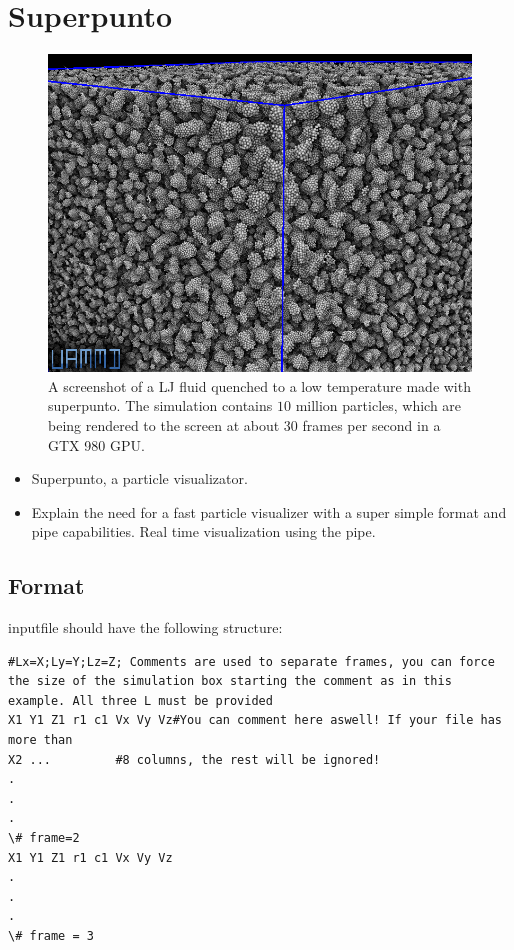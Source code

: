 \documentclass[ twoside,openright,titlepage,numbers=noenddot,%
headinclude,footinclude,cleardoublepage=empty,abstract=on,
BCOR=5mm,paper=a4,fontsize=11pt, dvipsnames
]{scrreprt}
\def\ucpp{uammd_cpp_lexer.py:UAMMDCppLexer -x}
\newcommand{\gpu}{\gls{GPU}\xspace}
\begin{document}
\chapter{Superpunto}
\begin{figure}[H]
  \label{fig:spunto}
  \centering
  \includegraphics[width=\textwidth]{gfx/shotlogo}
  \caption{A screenshot of a \gls{LJ} fluid quenched to a low temperature made with superpunto. The simulation contains $10$ million particles, which are being rendered to the screen at about 30 frames per second in a GTX 980 \gpu.}
\end{figure}

\begin{itemize}
\item Superpunto, a particle visualizator.
\item Explain the need for a fast particle visualizer with a super simple format and pipe capabilities. Real time visualization using the pipe.
  
\end{itemize}

\section{Format}
inputfile should have the following structure:
\begin{verbatim}
#Lx=X;Ly=Y;Lz=Z; Comments are used to separate frames, you can force the size of the simulation box starting the comment as in this example. All three L must be provided
X1 Y1 Z1 r1 c1 Vx Vy Vz#You can comment here aswell! If your file has more than
X2 ...         #8 columns, the rest will be ignored!
.
.
.
\# frame=2
X1 Y1 Z1 r1 c1 Vx Vy Vz
.
.
.
\# frame = 3
\end{verbatim}
\end{document}
